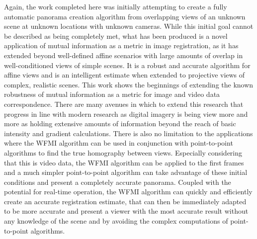 %
%
%
%
%
%
%
%
%

%
%
%



Again, the work completed here was initially attempting to create a fully automatic panorama creation algorithm from overlapping views of an unknown scene at unknown locations with unknown cameras. While this initial goal cannot be described as being completely met, what has been produced is a novel application of mutual information as a metric in image registration, as it has extended beyond well-defined affine scenarios with large amounts of overlap in well-conditioned views of simple scenes. It is a robust and accurate algorithm for affine views and is an intelligent estimate when extended to projective views of complex, realistic scenes. This work shows the beginnings of extending the known robustness of mutual information as a metric for image and video data correspondence. There are many avenues in which to extend this research that progress in line with modern research as digital imagery is being view more and more as holding extensive amounts of information beyond the reach of basic intensity and gradient calculations. There is also no limitation to the applications where the WFMI algorithm can be used in conjunction with point-to-point algorithms to find the true homography between views. Especially considering that this is video data, the WFMI algorithm can be applied to the first frames and a much simpler point-to-point algorithm can take advantage of these initial conditions and present a completely accurate panorama. Coupled with the potential for real-time operation, the WFMI algorithm can quickly and efficiently create an accurate registration estimate, that can then be immediately adapted to be more accurate and present a viewer with the most accurate result without any knowledge of the scene and by avoiding the complex computations of point-to-point algorithms.


